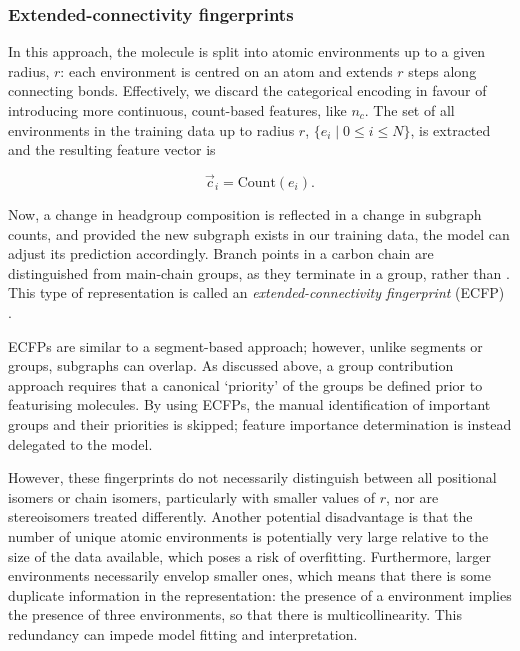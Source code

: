 
\subsubsection{Extended-connectivity fingerprints}

In this approach, the molecule is split into atomic environments up to a given
radius, $r$: each environment is centred on an atom and extends $r$ steps along
connecting bonds. Effectively, we discard the categorical encoding in favour of
introducing more continuous, count-based features, like $n_c$. The set of all
environments in the training data up to radius $r$, $\{e_i \mid 0 \leq i \leq
    N\}$, is extracted and the resulting feature vector is

\begin{equation}
    \label{eq:ecfp}
    \vec{c}_i = \text{Count}(e_i).
\end{equation}

Now, a change in headgroup composition is reflected in a change in subgraph
counts, and provided the new subgraph exists in our training data, the model can
adjust its prediction accordingly. Branch points in a carbon chain are
distinguished from main-chain groups, as they terminate in a  group,
rather than . This type of representation is called an
\emph{extended-connectivity fingerprint} (ECFP)
\cite{rogersExtendedConnectivityFingerprints2010}.

ECFPs are similar to a segment-based approach; however, unlike segments or
groups, subgraphs can overlap. As discussed above, a group contribution approach
requires that a canonical `priority' of the groups be defined prior to
featurising molecules. By using ECFPs, the manual identification of important
groups and their priorities is skipped; feature importance determination is
instead delegated to the model.

However, these fingerprints do not necessarily distinguish between all
positional isomers or chain isomers, particularly with smaller values of $r$,
nor are stereoisomers treated differently. Another potential disadvantage is
that the number of unique atomic environments is potentially very large relative
to the size of the data available, which poses a risk of overfitting.
Furthermore, larger environments necessarily envelop smaller ones, which means
that there is some duplicate information in the representation: the presence of
a  environment implies the presence of three  environments,
so that there is multicollinearity. This redundancy can impede model fitting and
interpretation.

